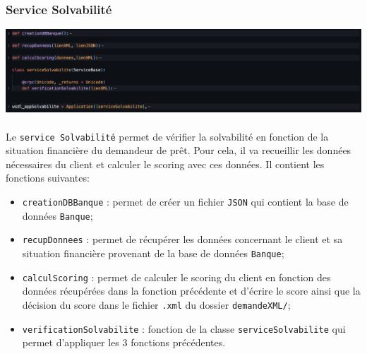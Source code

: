 \documentclass{article}
\begin{document}
    \subsubsection{Service Solvabilité}
      \includegraphics[width=\textwidth]{Images/7.2/serviceSolvabilite.png}\\
      \\
      Le \texttt{service Solvabilité} permet de vérifier la solvabilité en fonction de la situation financière du demandeur de prêt. Pour cela, il va recueillir les données nécessaires du client et calculer le scoring avec ces données. Il contient les fonctions suivantes:
      \begin{itemize}
          \item \texttt{creationDBBanque} : permet de créer un fichier \texttt{JSON} qui contient la base de données \texttt{Banque};
          \item \texttt{recupDonnees} : permet de récupérer les données concernant le client et sa situation financière provenant de la base de données \texttt{Banque};
          \item \texttt{calculScoring} : permet de calculer le scoring du client en fonction des données récupérées dans la fonction précédente et d'écrire le score ainsi que la décision du score dans le fichier \texttt{.xml} du dossier \texttt{demandeXML/};
          \item \texttt{verificationSolvabilite} : fonction de la classe \texttt{serviceSolvabilite} qui permet d'appliquer les 3 fonctions précédentes.
      \end{itemize}
\end{document}
